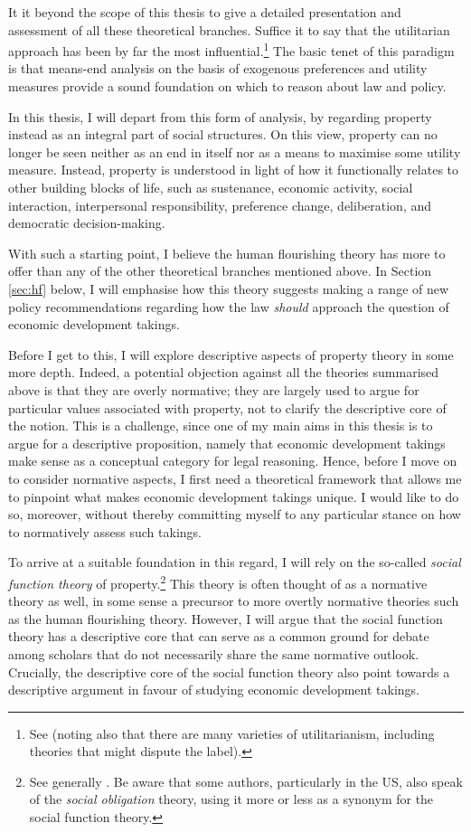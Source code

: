 It it beyond the scope of this thesis to give a detailed presentation and assessment of all these theoretical branches. Suffice it to say that the utilitarian approach has been by far the most influential.\footnote{See \cite[11]{alexander12} (noting also that there are many varieties of utilitarianism, including theories that might dispute the label).} The basic tenet of this paradigm is that means-end analysis on the basis of exogenous preferences and utility measures provide a sound foundation on which to reason about law and policy.

In this thesis, I will depart from this form of analysis, by regarding property instead as an integral part of social structures. On this view,  property can no longer be seen neither as an end in itself nor as a means to maximise some utility measure. Instead, property is understood in light of how it functionally relates to other building blocks of life, such as sustenance, economic activity, social interaction, interpersonal responsibility, preference change, deliberation,  and democratic decision-making.

With such a starting point, I believe the human flourishing theory has more to offer than any of the other theoretical branches mentioned above. In Section \ref{sec:hf} below, I will emphasise how this theory suggests making a range of new policy recommendations regarding how the law {\it should} approach the question of economic development takings.

Before I get to this, I will explore descriptive aspects of property theory in some more depth. Indeed, a potential objection against all the theories summarised above is that they are overly normative; they are largely used to argue for particular values associated with property, not to clarify the descriptive core of the notion. This is a challenge, since one of my main aims in this thesis is to argue for a descriptive proposition, namely that economic development takings make sense as a conceptual category for legal reasoning. Hence, before I move on to consider normative aspects, I first need a theoretical framework that allows me to pinpoint what makes economic development takings unique. I would like to do so, moreover, without thereby committing myself to any particular stance on how to normatively assess such takings.

To arrive at a suitable foundation in this regard, I will rely on the so-called {\it social function theory} of property.\footnote{See generally \cite{foster11,mirow10,alexander09a}. Be aware that some authors, particularly in the US, also speak of the {\it social obligation} theory, using it more or less as a synonym for the social function theory.} This theory is often thought of as a normative theory as well, in some sense a precursor to more overtly normative theories such as the human flourishing theory. However, I will argue that the social function theory has a descriptive core that can serve as a common ground for debate among scholars that do not necessarily share the same normative outlook. Crucially, the descriptive core of the social function theory also point towards a descriptive argument in favour of studying economic development takings.


